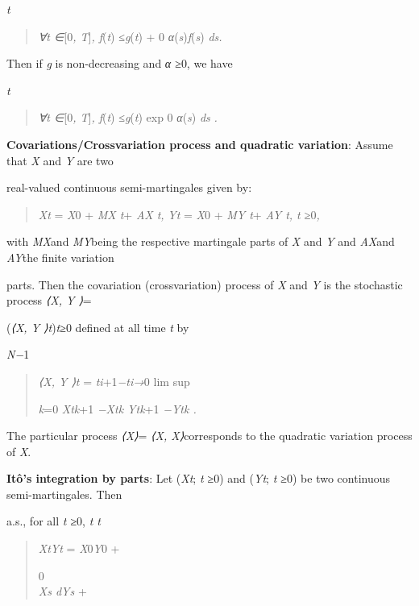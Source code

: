 \documentclass[
]{article}
\begin{document}
\begin{longtable}[]
\begin{minipage}[b]{\linewidth}
\begin{minipage}[b]{\linewidth}
{\begin{minipage}[b]{\linewidth}
\emph{t}

\begin{quote}
\emph{∀t ∈}{[}0\emph{, T}{]}\emph{, f}(\emph{t}) \emph{≤g}(\emph{t}) + 0
\emph{α}(\emph{s})\emph{f}(\emph{s}) \emph{ds.}
\end{quote}

Then if \emph{g} is non-decreasing and \emph{α ≥}0, we have

\emph{t}

\begin{quote}
\emph{∀t ∈}{[}0\emph{, T}{]}\emph{, f}(\emph{t}) \emph{≤g}(\emph{t}) exp
0 \emph{α}(\emph{s}) \emph{ds} \emph{.}
\end{quote}

\textbf{Covariations/Crossvariation process and quadratic variation}:
Assume that \emph{X} and \emph{Y} are two

real-valued continuous semi-martingales given by:

\begin{quote}
\emph{Xt} = \emph{X}0 + \emph{MX t}+ \emph{AX t,} \emph{Yt} = \emph{X}0
+ \emph{MY t}+ \emph{AY t, t ≥}0\emph{,}
\end{quote}

with \emph{MX}and \emph{MY}being the respective martingale parts of
\emph{X} and \emph{Y} and \emph{AX}and \emph{AY}the finite variation

parts. Then the covariation (crossvariation) process of \emph{X} and
\emph{Y} is the stochastic process \emph{⟨X, Y ⟩}=

(\emph{⟨X, Y ⟩t})\emph{t≥}0 defined at all time \emph{t} by

\emph{N−}1

\begin{quote}
\emph{⟨X, Y ⟩t} = \emph{\textbar ti}+1\emph{−ti\textbar→}0 lim sup

\emph{k}=0 \emph{Xtk}+1 \emph{−Xtk Ytk}+1 \emph{−Ytk .}
\end{quote}

The particular process \emph{⟨X⟩}= \emph{⟨X, X⟩}corresponds to the
quadratic variation process of \emph{X}.

\textbf{Itô's integration by parts}: Let (\emph{Xt}; \emph{t ≥}0) and
(\emph{Yt}; \emph{t ≥}0) be two continuous semi-martingales. Then

a.s., for all \emph{t ≥}0, \emph{t t}

\begin{quote}
\emph{XtYt} = \emph{X}0\emph{Y}0 +

0\\
\emph{Xs dYs} +


\end{quote}
\end{minipage}}
\end{minipage}
\end{minipage}
\end{longtable}
\end{document}

